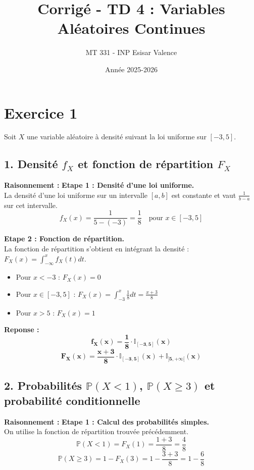 \documentclass[11pt,a4paper]{article}
\title{Corrigé - TD 4 : Variables Aléatoires Continues}
\author{MT 331 - INP Esisar Valence}
\date{Année 2025-2026}
\begin{document}
\maketitle

\section*{Exercice 1}

Soit $X$ une variable aléatoire à densité suivant la loi uniforme sur $[-3, 5]$.

\subsection*{1. Densité $f_X$ et fonction de répartition $F_X$}

\textbf{Raisonnement :} 
\textbf{Etape 1 : Densité d'une loi uniforme.}\\
La densité d'une loi uniforme sur un intervalle $[a, b]$ est constante et vaut $\frac{1}{b-a}$ sur cet intervalle.
$$ f_X(x) = \frac{1}{5 - (-3)} = \frac{1}{8} \quad \text{pour } x \in [-3, 5] $$

\textbf{Etape 2 : Fonction de répartition.}\\
La fonction de répartition s'obtient en intégrant la densité : $F_X(x) = \int_{-\infty}^x f_X(t)dt$.
\begin{itemize}
    \item Pour $x < -3$ : $F_X(x) = 0$
    \item Pour $x \in [-3, 5]$ : $F_X(x) = \int_{-3}^x \frac{1}{8} dt = \frac{x+3}{8}$
    \item Pour $x > 5$ : $F_X(x) = 1$
\end{itemize}

\textbf{Reponse :}
$$ \mathbf{f_X(x) = \frac{1}{8} \cdot \mathbb{I}_{[-3, 5]}(x)} $$
$$ \mathbf{F_X(x) = \frac{x+3}{8} \cdot \mathbb{I}_{[-3, 5]}(x) + \mathbb{I}_{]5, +\infty[}(x)} $$

\subsection*{2. Probabilités $\mathbb{P}(X<1)$, $\mathbb{P}(X\ge 3)$ et probabilité conditionnelle}

\textbf{Raisonnement :}
\textbf{Etape 1 : Calcul des probabilités simples.}\\
On utilise la fonction de répartition trouvée précédemment.
$$ \mathbb{P}(X < 1) = F_X(1) = \frac{1+3}{8} = \frac{4}{8} $$
$$ \mathbb{P}(X \ge 3) = 1 - F_X(3) = 1 - \frac{3+3}{8} = 1 - \frac{6}{8} $$
\end{document}
